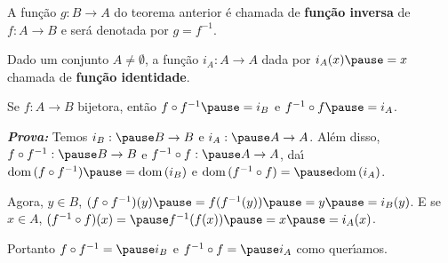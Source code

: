 \documentclass{beamer}
\begin{document}
    \begin{frame}
        \begin{definicao}
            A fun\c{c}\~ao $g : B \to A$ \pause do teorema anterior \pause \'e chamada de \textbf{fun\c{c}\~ao inversa} \pause de $f : A \to B$ \pause e ser\'a denotada por $g = f^{-1}$.\pause
        \end{definicao}


        \begin{definicao}
            Dado um conjunto $A \ne \emptyset$, \pause a fun{\c c}{\~a}o $i_{A}: A \to A$ \pause dada por $i_{A}(x) \pause = x$  chamada de \pause \textbf{fun{\c c}{\~a}o identidade}.\pause
        \end{definicao}
    \end{frame}

    \begin{frame}
        \begin{proposicao}
            Se $f : A \to B$  bijetora, \pause ent{\~a}o $f\circ f^{-1} \pause = i_{B}$ \pause e $f^{-1}\circ f \pause = i_{A}$.\pause
        \end{proposicao}
        \textbf{\textit{Prova: }}\pause
        Temos $i_{B} : \pause B \to B$ \pause e $i_{A} : \pause A \to A$. \pause Al{\'e}m disso, \pause $f\circ f^{-1} : \pause B \to B$ \pause e $f^{-1}\circ f : \pause A \to A$, \pause da{\'\i} $\dom(f\circ f^{-1}) \pause = \dom(i_{B})$ \pause e $\dom(f^{-1}\circ f) = \pause \dom(i_{A})$. \pause 

        \vspace{.5cm}

        Agora, $y \in B$, \pause $(f\circ f^{-1})(y) \pause = f(f^{-1}(y)) \pause = y \pause = i_{B}(y)$. \pause E se $x \in A$, \pause $(f^{-1}\circ f)(x) = \pause f^{-1}(f(x)) \pause = x \pause = i_{A}(x)$. \pause 

        \vspace{.5cm}

        Portanto $f\circ f^{-1} = \pause i_{B}$ \pause e $f^{-1}\circ f = \pause i_{A}$ como quer{\'\i}amos.\pause \hspace{.5cm} \qedsymbol
    \end{frame}
\end{document}
